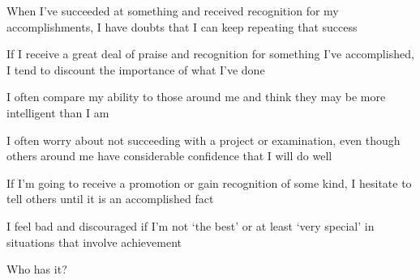 \documentclass[aspectratio=169]{beamer}
\begin{document}
\begin{frame}
  \begin{center}
    \Huge   When  I’ve  succeeded  at  something  and  received  recognition  for  my  accomplishments,  I  have  doubts  that I can keep repeating that success
\end{center}
\end{frame}

\begin{frame}
  \begin{center}
    \Huge     If  I  receive  a  great  deal  of  praise  and  recognition  for  something  I’ve  accomplished,  I  tend  to  discount  the  importance
  of  what  I’ve  done
\end{center}
\end{frame}

\begin{frame}
  \begin{center}
    \Huge     I often compare my ability to those around me and think they may be more intelligent than I am
  \end{center}
\end{frame}

\begin{frame}
  \begin{center}
    \Huge      I often worry about not succeeding with a project or examination, even though others around me have considerable
confidence that I will do well
\end{center}
\end{frame}

\begin{frame}
  \begin{center}
    \Huge       If  I’m  going  to  receive  a  promotion  or  gain  recognition  of  some  kind,  I  hesitate  to  tell  others  until  it  is  an
  accomplished fact
\end{center}
\end{frame}

\begin{frame}
  \begin{center}
    \Huge  I  feel  bad  and  discouraged  if  I’m  not  `the  best'  or  at  least  `very  special'  in  situations  that  involve  achievement
\end{center}
\end{frame}

\begin{frame}
  \begin{center}
    \Huge Who has it?
    \\ \small \cite{clanceimes78}
    \\ \small \cite{attr98}
    \\ \small \cite{colour}
  \end{center}
\end{frame}
\end{document}
